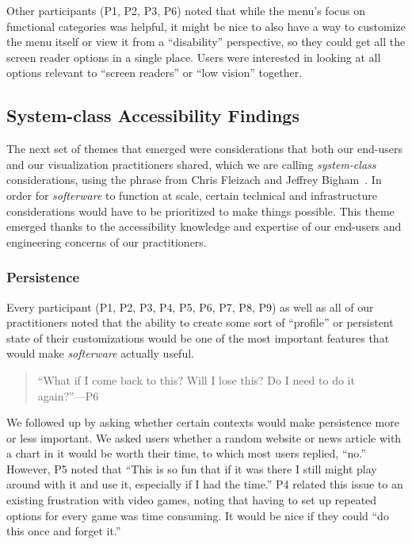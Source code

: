 \documentclass[12pt]{cmuthesis}
\begin{document}
Other participants (P1, P2, P3, P6) noted that while the menu's focus on functional categories was helpful, it might be nice to also have a way to customize the menu itself or view it from a ``disability'' perspective, so they could get all the screen reader options in a single place. Users were interested in looking at all options relevant to ``screen readers'' or ``low vision'' together.

\subsection{System-class Accessibility Findings}
The next set of themes that emerged were considerations that both our end-users and our visualization practitioners shared, which we are calling \textit{system-class} considerations, using the phrase from Chris Fleizach and Jeffrey Bigham~\cite{Fleizach}. In order for \textit{softerware} to function at scale, certain technical and infrastructure considerations would have to be prioritized to make things possible. This theme emerged thanks to the accessibility knowledge and expertise of our end-users and engineering concerns of our practitioners.

\subsubsection{Persistence}
Every participant (P1, P2, P3, P4, P5, P6, P7, P8, P9) as well as all of our practitioners noted that the ability to create some sort of ``profile'' or persistent state of their customizations would be one of the most important features that would make \textit{softerware} actually useful.

\begin{quote}
``What if I come back to this? Will I lose this? Do I need to do it again?''---P6
\end{quote}

We followed up by asking whether certain contexts would make persistence more or less important. We asked users whether a random website or news article with a chart in it would be worth their time, to which most users replied, ``no.'' However, P5 noted that ``This is so fun that if it was there I still might play around with it and use it, especially if I had the time.'' P4 related this issue to an existing frustration with video games, noting that having to set up repeated options for every game was time consuming. It would be nice if they could ``do this once and forget it.''
\end{document}
